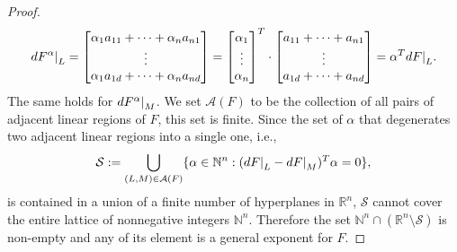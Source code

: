 \documentclass{article}
\theoremstyle{definition}
\newcommand\restr[2]{{%
  \left.\kern-\nulldelimiterspace %
  #1 %
  \right|_{#2} %
  }}
\begin{document}
\begin{proof}
$$d\restr{F^{\alpha}}{L} = \begin{bmatrix}
\alpha_1 a_{11} + \dots + \alpha_n a_{n1} \\
\vdots \\
\alpha_1 a_{1d} + \dots + \alpha_n a_{nd}
\end{bmatrix} = \begin{bmatrix}
\alpha_1 \\
\vdots \\
\alpha_n
\end{bmatrix}^{T}
\cdot \begin{bmatrix}
 a_{11} + \dots + a_{n1} \\
\vdots \\
a_{1d} + \dots + a_{nd}
\end{bmatrix}
= \alpha^{T}d\restr{F}{L}.$$
The same holds for $d\restr{F^{\alpha}}{M}$. We set $\mathcal{A}(F)$ to be the collection of all pairs of adjacent linear regions of $F$, this set is finite. Since the set of $\alpha$ that degenerates two adjacent linear regions into a single one, i.e.,
$$\mathcal{S} := \displaystyle\bigcup_{(L,M) \in \mathcal{A}(F)}\{\alpha \in \mathbb{N}^{n} : (d\restr{F}{L} - d\restr{F}{M})^{T}\alpha=0\},$$
is contained in a union of a finite number of hyperplanes in $\mathbb{R}^{n}$, $\mathcal{S}$ cannot cover the entire lattice of nonnegative integers $\mathbb{N}^{n}$.
Therefore the set $\mathbb{N}^{n} \cap (\mathbb{R}^{n} \setminus \mathcal{S})$ is non-empty and any of its element is a general exponent for $F$.
\end{proof}
\end{document}
